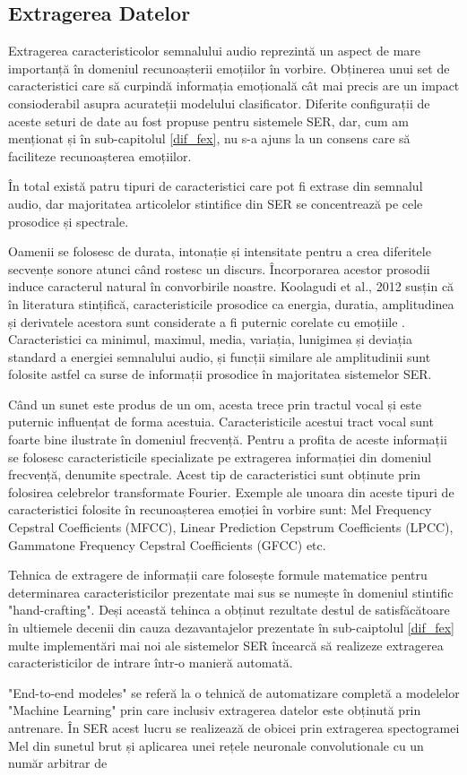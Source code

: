 \documentclass[a4paper,12pt]{book}
\begin{document}
					\subsection{Extragerea Datelor}
						Extragerea caracteristicolor semnalului audio reprezintă un aspect de mare importanță în domeniul recunoașterii emoțiilor în vorbire. Obținerea unui set de caracteristici care să  curpindă informația emoțională cât mai precis are un impact consioderabil asupra acurateții modelului clasificator. Diferite configurații de aceste seturi de date au fost propuse pentru sistemele SER, dar, cum am menționat și în sub-capitolul \ref{dif_fex}, nu s-a ajuns la un consens care să faciliteze recunoașterea emoțiilor. \par În total există patru tipuri de caracteristici care pot fi extrase din semnalul audio, dar majoritatea articolelor stintifice din SER se concentrează pe cele prosodice și spectrale.\par Oamenii se folosesc de durata, intonație și intensitate pentru a crea diferitele secvențe sonore atunci când rostesc un discurs. Încorporarea acestor prosodii induce caracterul natural în convorbirile noastre. Koolagudi et al., 2012 \cite{koolagudi} susțin că în literatura stințifică, caracteristicile prosodice ca energia, duratia, amplitudinea și derivatele acestora sunt considerate a fi puternic corelate cu emoțiile \cite{dellaert,hcf2,hcf3}. Caracteristici ca minimul, maximul, media, variația, lunigimea și deviația standard a energiei semnalului audio, și funcții similare ale amplitudinii sunt folosite astfel ca surse de informații prosodice în majoritatea sistemelor SER. \par Când un sunet este produs de un om, acesta trece prin tractul vocal și este puternic influențat de forma acestuia. Caracteristicile acestui tract vocal sunt foarte bine ilustrate în domeniul frecvență. Pentru a profita de aceste informații se folosesc caracteristicile specializate pe extragerea informației din domeniul frecvență, denumite spectrale. Acest tip de caracteristici sunt obținute prin folosirea celebrelor transformate Fourier. Exemple ale unoara din aceste tipuri de caracteristici folosite în recunoașterea emoției în vorbire sunt: Mel Frequency Cepstral Coefficients (MFCC), Linear Prediction Cepstrum Coefficients (LPCC), Gammatone Frequency Cepstral Coefficients (GFCC) etc. \par Tehnica de extragere de informații care folosește formule matematice pentru determinarea caracteristicilor prezentate mai sus se numește în domeniul stintific "hand-crafting". Deși această tehinca a obținut rezultate destul de satisfăcătoare în ultiemele decenii din cauza dezavantajelor prezentate în sub-caiptolul \ref{dif_fex} multe implementări mai noi ale sistemelor SER încearcă să realizeze extragerea caracteristicilor de intrare într-o manieră automată. \par "End-to-end modeles" se referă la o tehnică de automatizare completă a modelelor "Machine Learning" prin care inclusiv extragerea datelor este obținută prin antrenare. În SER acest lucru se realizează de obicei prin extragerea spectogramei Mel din sunetul brut și aplicarea unei rețele neuronale convolutionale cu un număr arbitrar de 
\end{document}
